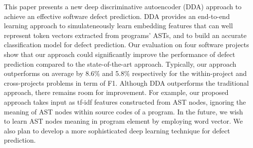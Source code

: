 
This paper presents a new deep  discriminative autoencoder (DDA) approach to achieve an effective software defect prediction. DDA provides an end-to-end learning approach to simulateneously learn embedding features that can well represent token vectors extracted from programs' ASTs, and to build an accurate classification model for defect prediction. Our evaluation on four software projects show that our approach could significantly improve the performance of defect prediction compared to the state-of-the-art approach. Typically, our approach outperforms on average by 8.6\% and 5.8\% respectively for the within-project and cross-projects problems in term of F1. Although DDA outperforms the traditional approach, there remains room for improvement. For example, our proposed approach takes input as tf-idf features constructed from AST nodes, ignoring the meaning of AST nodes within source codes of a program. In the future, we wish to learn AST nodes meaning in program element by employing word vector. We also
plan to develop a more sophisticated deep learning technique for defect prediction. 

%

